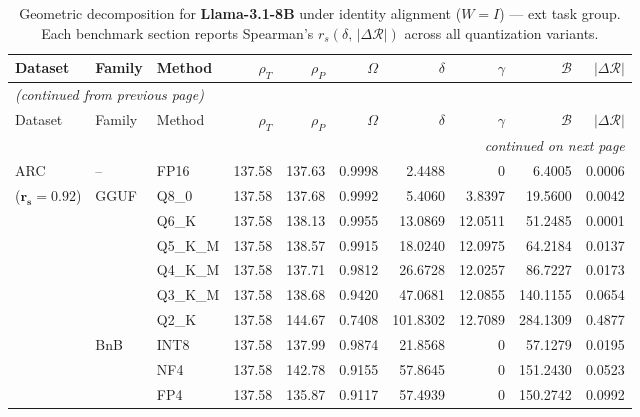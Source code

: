 \begingroup
\small
\setlength{\tabcolsep}{4pt}
\renewcommand{\arraystretch}{1.05}
\setlength{\LTcapwidth}{\textwidth}
\begin{longtable}{ll l rrrrrrr}
\caption{Geometric decomposition for \textbf{Llama-3.1-8B} under identity alignment ($W{=}I$) --- ext task group. Each benchmark section reports Spearman's $r_s(\delta,\,|\Delta\mathcal{R}|)$ across all quantization variants.}\label{tab:llama_decomposition_ext}\\
\toprule
Dataset & Family & Method & $\rho_T$ & $\rho_P$ & $\Omega$ & $\delta$ & $\gamma$ & $\mathcal{B}$ & $|\Delta\mathcal{R}|$ \\
\midrule
\endfirsthead
\multicolumn{10}{l}{\small\itshape (continued from previous page)}\\
\toprule
Dataset & Family & Method & $\rho_T$ & $\rho_P$ & $\Omega$ & $\delta$ & $\gamma$ & $\mathcal{B}$ & $|\Delta\mathcal{R}|$ \\
\midrule
\endhead
\midrule
\multicolumn{10}{r}{\small\itshape continued on next page}\\
\endfoot
\bottomrule
\endlastfoot
ARC & -- & FP16 & 137.58 & 137.63 & 0.9998 & 2.4488 & \cellcolor{cyan!12} $0$ & 6.4005 & 0.0006 \\
{\small ($\mathbf{r_s{=}0.92}$)} & GGUF & Q8\_0 & 137.58 & 137.68 & 0.9992 & 5.4060 & 3.8397 & 19.5600 & 0.0042 \\
 &  & Q6\_K & 137.58 & 138.13 & 0.9955 & 13.0869 & 12.0511 & 51.2485 & 0.0001 \\
 &  & Q5\_K\_M & 137.58 & 138.57 & 0.9915 & 18.0240 & 12.0975 & 64.2184 & 0.0137 \\
 &  & Q4\_K\_M & 137.58 & 137.71 & 0.9812 & 26.6728 & 12.0257 & 86.7227 & 0.0173 \\
 &  & Q3\_K\_M & 137.58 & 138.68 & \cellcolor{red!18} 0.9420 & \cellcolor{red!18} 47.0681 & 12.0855 & \cellcolor{red!18} 140.1155 & \cellcolor{red!18} 0.0654 \\
 &  & Q2\_K & 137.58 & 144.67 & \cellcolor{red!35} 0.7408 & \cellcolor{red!35} 101.8302 & 12.7089 & \cellcolor{red!35} 284.1309 & \cellcolor{red!35} 0.4877 \\
 & BnB & INT8 & 137.58 & 137.99 & 0.9874 & 21.8568 & \cellcolor{cyan!12} $0$ & 57.1279 & 0.0195 \\
 &  & NF4 & 137.58 & 142.78 & \cellcolor{red!18} 0.9155 & \cellcolor{red!18} 57.8645 & \cellcolor{cyan!12} $0$ & \cellcolor{red!18} 151.2430 & \cellcolor{red!18} 0.0523 \\
 &  & FP4 & 137.58 & 135.87 & \cellcolor{red!18} 0.9117 & \cellcolor{red!18} 57.4939 & \cellcolor{cyan!12} $0$ & \cellcolor{red!18} 150.2742 & \cellcolor{red!18} 0.0992 \\

\end{longtable}
